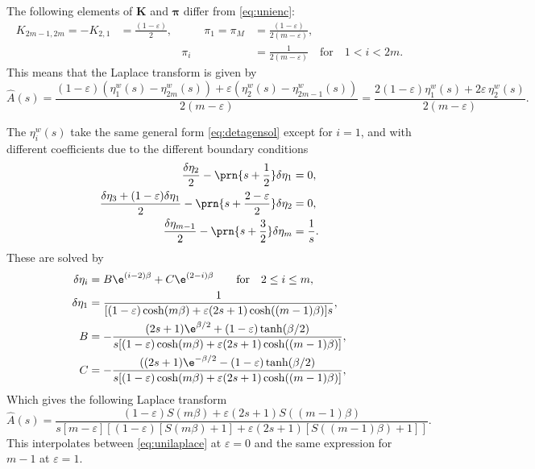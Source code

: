 \documentclass[12pt]{article}
\newcommand{\eqm}{\pi}
\newcommand{\eq}{\boldsymbol{\eqm}}
\newcommand{\etwm}{\eta^w}
\newcommand{\encm}{K}
\newcommand{\enc}{\mathbf{\encm}}
\begin{document}
The following elements of \(\enc\) and \(\eq\) differ from \eqref{eq:unienc}:
%
\begin{equation}\label{eq:shortenenc}
  \begin{aligned}
  \encm_{2m-1,2m} = -\encm_{2,1} &= \frac{(1-\varepsilon)}{2},
  &\qquad
  \eqm_1 = \eqm_M &= \frac{(1-\varepsilon)}{2(m-\varepsilon)},
  \\ &&
  \eqm_i &=  \frac{1}{2(m-\varepsilon)}
  \quad\text{for}\quad 1<i<2m.
  \end{aligned}
\end{equation}
%
This means that the Laplace transform is given by
%
\begin{equation}\label{eq:shortenareaeta}
  \hat{A}(s) = \frac{(1-\varepsilon)(\etwm_1(s)-\etwm_{2m}(s)) 
                      + \varepsilon(\etwm_2(s)-\etwm_{2m-1}(s))}
                    {2(m-\varepsilon)}
       = \frac{2(1-\varepsilon) \etwm_1(s) + 2\varepsilon\,\etwm_2(s)}
              {2(m-\varepsilon)}.
\end{equation}
%

The \(\etwm_i(s)\) take the same general form \eqref{eq:detagensol} except for \(i=1\), and with different coefficients due to the different boundary conditions
%
\begin{equation}\label{eq:detabndshorten}
\begin{aligned}
  \frac{\delta\eta_2}{2} - \prn{s+\frac{1}{2}}\delta\eta_1 &= 0, \\
  \frac{\delta\eta_3 + (1-\varepsilon)\delta\eta_1}{2} - \prn{s+\frac{2-\varepsilon}{2}}\delta\eta_2 &= 0, \\
  \frac{\delta\eta_{m-1}}{2} - \prn{s+\frac{3}{2}}\delta\eta_{m} &= \frac{1}{s}.
\end{aligned}
\end{equation}
%
These are solved by
%
%
\begin{equation}\label{eq:shortensol}
\begin{aligned}
  \delta\eta_i &= B\e^{(i-2)\beta} + C\e^{(2-i)\beta} \qquad
        \text{for} \quad 2 \leq i \leq m, \\
  \delta\eta_1 &= \frac{1}
         {[(1-\varepsilon)\cosh(m\beta) + \varepsilon(2s+1)\cosh((m-1)\beta)]s}, \\
  B &= - \frac{(2s+1) \e^{\beta/2} + (1-\varepsilon) \tanh(\beta/2)}
         {s [(1-\varepsilon)\cosh(m\beta) + \varepsilon(2s+1)\cosh((m-1)\beta)]}, \\
  C &= - \frac{((2s+1) \e^{-\beta/2} - (1-\varepsilon) \tanh(\beta/2)}
         {s [(1-\varepsilon)\cosh(m\beta) + \varepsilon(2s+1)\cosh((m-1)\beta)]}, \\
\end{aligned}
\end{equation}
%
Which gives the following Laplace transform
%
\begin{equation}\label{eq:shortenlaplace}
  \hat{A}(s) = \frac{(1-\varepsilon) S(m\beta) + \varepsilon(2s+1) S((m-1)\beta)}
          { s [m-\varepsilon]
            [(1-\varepsilon)[S(m\beta) + 1] + \varepsilon(2s+1)[S((m-1)\beta) + 1]] }.
\end{equation}
%
This interpolates between \eqref{eq:unilaplace} at \(\varepsilon=0\) and the same expression for \(m-1\) at \(\varepsilon=1\).
\end{document}
